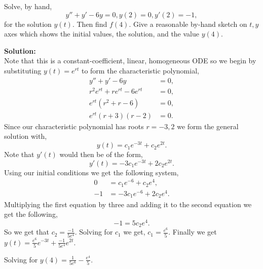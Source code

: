 \documentclass[12pt]{article}
\makeatletter
\theoremstyle{homework}
\newenvironment{exercise}[1]
{\def\@currentlabel{#1}\exercisecore}
{\endexercisecore}
\newcommand{\localhead}[1]{\par\smallskip\noindent\textbf{#1}\nobreak\\}%
\newcommand\solution{\localhead{Solution:}}
\makeatother
\begin{document}
\begin{exercise}{Problem P4} Solve, by hand, 
  \begin{equation*}
    y'' + y' - 6y = 0, y(2) = 0, y'(2) = -1,
  \end{equation*}
  for the solution $y(t)$. Then find $f(4)$. Give a reasonable by-hand sketch on $t, y$ axes
  which shows the initial values, the solution, and the value $y(4)$.

  \solution Note that this is a constant-coefficient, linear, homogeneous ODE so we begin by substituting $y(t) = e^{rt}$ to form the characteristic polynomial, 
  \begin{align*}
    y'' + y' - 6y &= 0,\\
    r^2e^{rt} + re^{rt} - 6e^{rt} &= 0,\\
    e^{rt}(r^2 + r - 6) &= 0,\\
    e^{rt}(r + 3)(r - 2) &= 0.
  \end{align*} 
  Since our characteristic polynomial has roots $r = -3, 2$ we form the general solution with, 
  \begin{equation*}
    y(t) = c_1e^{-3t} + c_2e^{2t}.
  \end{equation*}
  Note that $y'(t)$ would then be of the form, 
  \begin{equation*}
    y'(t) = -3c_1e^{-3t} + 2c_2e^{2t}.
  \end{equation*}
  Using our initial conditions we get the following system, 
  \begin{align*}
    0 &= c_1e^{-6} + c_2e^{4},\\
    -1 &= -3c_1e^{-6} + 2c_2e^{4}.
  \end{align*}
  Multiplying the first equation by three and adding it to the second equation we get the following, 
  \begin{equation*}
    -1 = 5c_2e^{4}.
  \end{equation*}
  So we get that $c_2 = \frac{-1}{5e^{4}}$. Solving for $c_1$ we get, $c_1 = \frac{e^6}{5}$. 
  Finally we get $y(t) =  \frac{e^6}{5}e^{-3t} + \frac{-1}{5e^{4}}e^{2t}$.

  Solving for $y(4) = \frac{1}{5e^6}-\frac{e^4}{5}$.
\end{exercise}
\vspace{3in}
\end{document}

